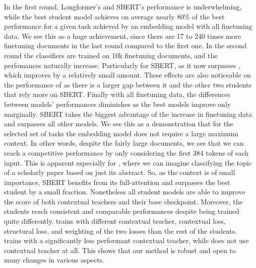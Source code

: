 In the first round, Longformer's and SBERT's performance is underwhelming,
while the best student model achieves on average nearly 80\% of the best
performance for a given task achieved by an embedding model with all finetuning
data. We see this as a huge achievement, since there are 17 to 240 times more
finetuning documents in the last round compared to the first one. In the second
round the classifiers are trained on 10k finetuning documents, and the
perfomances naturally increase. Particularly for SBERT, as it now surpasses
, which improves by a relatively small amount. These effects are also
noticeable on the performance of {\CosineStudent} as there is a larger gap
between it and the other two students that rely more on SBERT. Finally with all
finetuning data, the differences between models' performances diminishes as the
best models improve only marginally. SBERT takes the biggest advantage of the
increase in finetuning data and surpasses all other models. We see this as a
demonstration that for the selected set of tasks the embedding model does not
require a large maximum context. In other words, despite the fairly large
documents, we see that we can reach a competitive performance by only
considering the first 384 tokens of each input. This is apparent especially for
, where we can imagine classifying the topic of a scholarly paper
based on just its abstract. So, as the context is of small importance, SBERT
benefits from its full-attention and surpasses the best student by a small
fraction. Nonetheless all student models are able to improve the score of both
contextual teachers and their base checkpoint. Moreover, the students reach
consistent and comparable performances despite being trained quite differently.
{\CosineStudent} trains with different contextual teacher, contextual loss,
structural loss, and weighting of the two losses than the rest of the students.
{\MSEStudent} trains with a significantly less performant contextual teacher,
while {\OnlyMSEStudent} does not use contextual teacher at all. This shows that
our method is robust and open to many changes in various aspects.


